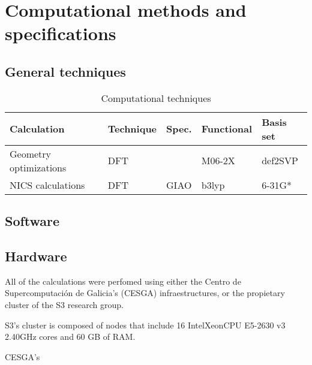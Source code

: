 \chapter{Computational methods and specifications}


\section{General techniques}



\begin{table*}[h]
    \centering
    \caption{Computational techniques}
    \label{tab:computational_techinques}
    \begin{tabular}{@{}lllll@{}}
        \toprule
        Calculation & Technique & Spec. & Functional & Basis set \\
        \midrule
        Geometry optimizations & DFT & & M06-2X & def2SVP \\
        NICS calculations & DFT & GIAO & b3lyp & 6-31G* \\
        \bottomrule
    \end{tabular}
\end{table*}
\blindtext


\section{Software}

\blindtext


\section{Hardware}
All of the calculations were perfomed using either the Centro de Supercomputación de Galicia's (CESGA) infraestructures, or the propietary cluster of the S3 research group.

S3's cluster is composed of nodes that include 16 Intel\textregistered Xeon\textregistered CPU E5-2630 v3 2.40GHz cores and 60 GB of RAM.

CESGA's
